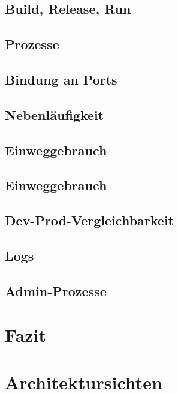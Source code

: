 \documentclass{beamer}
\begin{document}
			\subsection{Build, Release, Run}
			\subsection{Prozesse}
			\subsection{Bindung an Ports}
			\subsection{Nebenläufigkeit}
			\subsection{Einweggebrauch}
			\subsection{Einweggebrauch}
			\subsection{Dev-Prod-Vergleichbarkeit}
			\subsection{Logs}
			\subsection{Admin-Prozesse}
		\section{Fazit}
		\section{Architektursichten}
\end{document}
